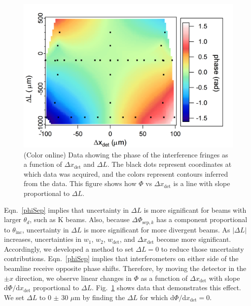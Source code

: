 \documentclass[twocolumn,prl,showpacs,superscriptaddress,longbibliography]{revtex4-1}   %
\newcommand{\figref}[1]{Fig.~\ref{#1}}
\newcommand{\eqnref}[1]{Eqn.~\eqref{#1}}
\newcommand{\dphisepk}{\Delta\Phi_{\mathrm{sep},k}}
\begin{document}
\begin{figure}
\includegraphics[scale=0.5]{phaseVsdxDetdLSurf_141202.png}
\caption{\label{PhaseVsThings}(Color online)
Data showing the phase of the interference fringes as a function of $\Delta x_{\mathrm{det}}$ and $\Delta L$. 
The black dots represent coordinates at which data was acquired, and the colors represent contours inferred from the data.
This figure shows how $\Phi$ vs $\Delta x_{\mathrm{det}}$ is a line with slope proportional to $\Delta L$. 
}
\end{figure}

\eqnref{phiSep} implies that uncertainty in $\Delta L$ is more significant for beams with larger $\theta_d$, such as K beams.
Also, because $\dphisepk$ has a component proportional to $\theta_{\mathrm{inc}}$, uncertainty in $\Delta L$ is more significant for more divergent beams.
As $|\Delta L|$ increases, uncertainties in $w_1$, $w_2$, $w_{\mathrm{det}}$, and $\Delta x_{\mathrm{det}}$ become more significant. Accordingly, we developed a method to set $\Delta L = 0$ to reduce those uncertainty contributions. 
\eqnref{phiSep} implies that interferometers on either side of the beamline receive opposite phase shifts. 
Therefore, by moving the detector in the $\pm x$ direction, we  observe linear changes in $\Phi$ as a function of $\Delta x_{\mathrm{det}}$ with slope $\mathrm{d}\Phi/\mathrm{d}x_{\mathrm{det}}$ proportional to $\Delta L$.
\figref{PhaseVsThings} shows data that demonstrates this effect.
We set $\Delta L$ to 0 $\pm$ 30 $\mu$m by finding the $\Delta L$ for which d$\Phi/$d$x_{\mathrm{det}} = 0$.
\end{document}
